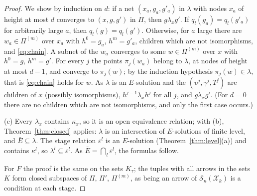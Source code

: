 \documentclass[11pt]{amsart}
\theoremstyle{definition}
\newcommand{\cX}{\mathcal X}
\newcommand{\cS}{\mathcal S}
\begin{document}
\begin{proof}
We show by induction on $d$: if a net $(x_a,g_a,g'_a)$ in $\lambda$
with nodes $x_a$ of height at most $d$ converges to $(x,g,g')$ in
$\Pi$, then $g\mathrel{\lambda_x}g'$. If $q_l(g_a)=q_l(g'_a)$ for
arbitrarily large $a$, then $q_l(g)=q_l(g')$. Otherwise, for $a$
large there are $w_a\in\Pi^{(m)}$ over $x_a$ with $h^0=g_a$,
$h^m=g'_a$, children which are not isomorphisms, and
\eqref{eq:chain}. A subnet of the $w_a$ converges to some $w\in
\Pi^{(m)}$ over $x$ with $h^0=g$, $h^m=g'$. For every $j$ the points
$\pi_j(w_a)$ belong to $\lambda$, at nodes of height at most $d-1$,
and converge to $\pi_j(w)$; by the induction hypothesis
$\pi_j(w)\in\lambda$, that is \eqref{eq:chain} holds for $w$. As
$\lambda$ is an $E$-solution and the $(\upsilon^j,\gamma^j,T^j)$ are
children of $x$ (possibly isomorphisms), $h^{j-1}\mathrel{\lambda_x}
h^j$ for all $j$, and $g\mathrel{\lambda_x}g'$. (For $d=0$ there are
no children which are not isomorphisms, and only the first case
occurs.)

(c) Every $\lambda_x$ contains $\kappa_x$, so it is an open
equivalence relation; with (b), Theorem~\ref{thm:closed} applies: $\lambda$ is an
intersection of $E$-solutions of finite level, and
$\bar E\subseteq\lambda$. The stage relation $\varepsilon^l$ is an
$E$-solution (Theorem~\ref{thm:level}(a)) and contains $\kappa^l$, so
$\lambda^l\subseteq\varepsilon^l$. As $\bar E=\bigcap_l
\varepsilon^l$, the formulas follow.

For $F$ the proof is the same on the sets $K_\tau$; the tuples with
all arrows in the sets $K$ form closed subspaces of $\Pi$, $\Pi'$,
$\Pi^{(m)}$, as being an arrow of $\cS_n(\cX_k)$ is a condition at
each stage.
\end{proof}
\end{document}
